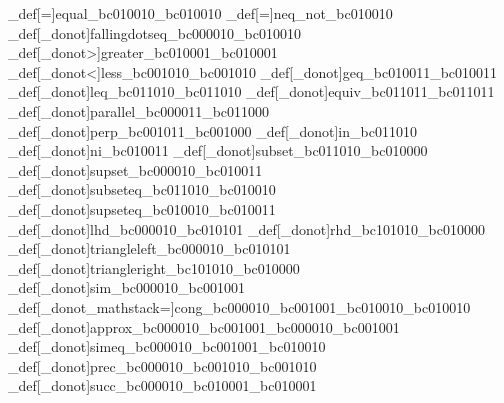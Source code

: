 \brl@char_def[=]{equal}{\brl@char_bc010010\brl@char_bc010010}
\brl@char_def[\brl@char@not=]{neq}{\brl@char@alias_not\brl@char_bc010010}
\brl@char_def[\brl@char_donot]{fallingdotseq}{\brl@char_bc000010\brl@char_bc010010}
\brl@char_def[\brl@char_donot>]{greater}{\brl@char_bc010001\brl@char_bc010001}
\brl@char_def[\brl@char_donot<]{less}{\brl@char_bc001010\brl@char_bc001010}
\brl@char_def[\brl@char_donot]{geq}{\brl@char_bc010011\brl@char_bc010011}
\brl@char_def[\brl@char_donot]{leq}{\brl@char_bc011010\brl@char_bc011010}
\brl@char_def[\brl@char_donot]{equiv}{\brl@char_bc011011\brl@char_bc011011}
\brl@char_def[\brl@char_donot]{parallel}{\brl@char_bc000011\brl@char_bc011000}
\brl@char_def[\brl@char_donot]{perp}{\brl@char_bc001011\brl@char_bc001000}
\brl@char_def[\brl@char_donot]{in}{\brl@char_bc011010}
\brl@char_def[\brl@char_donot]{ni}{\brl@char_bc010011}
\brl@char_def[\brl@char_donot]{subset}{\brl@char_bc011010\brl@char_bc010000}
\brl@char_def[\brl@char_donot]{supset}{\brl@char_bc000010\brl@char_bc010011}
\brl@char_def[\brl@char_donot]{subseteq}{\brl@char_bc011010\brl@char_bc010010}
\brl@char_def[\brl@char_donot]{supseteq}{\brl@char_bc010010\brl@char_bc010011}
\brl@char_def[\brl@char_donot]{lhd}{\brl@char_bc000010\brl@char_bc010101}
\brl@char_def[\brl@char_donot]{rhd}{\brl@char_bc101010\brl@char_bc010000}
\brl@char_def[\brl@char_donot]{triangleleft}{\brl@char_bc000010\brl@char_bc010101}
\brl@char_def[\brl@char_donot]{triangleright}{\brl@char_bc101010\brl@char_bc010000}
\brl@char_def[\brl@char_donot]{sim}{\brl@char_bc000010\brl@char_bc001001}
\brl@char_def[\brl@char_donot\brl@char_mathstack{}{=}]{cong}{\brl@char_bc000010\brl@char_bc001001\brl@char_bc010010\brl@char_bc010010}
\brl@char_def[\brl@char_donot]{approx}{\brl@char_bc000010\brl@char_bc001001\brl@char_bc000010\brl@char_bc001001}
\brl@char_def[\brl@char_donot]{simeq}{\brl@char_bc000010\brl@char_bc001001\brl@char_bc010010}
\brl@char_def[\brl@char_donot]{prec}{\brl@char_bc000010\brl@char_bc001010\brl@char_bc001010}
\brl@char_def[\brl@char_donot]{succ}{\brl@char_bc000010\brl@char_bc010001\brl@char_bc010001}
